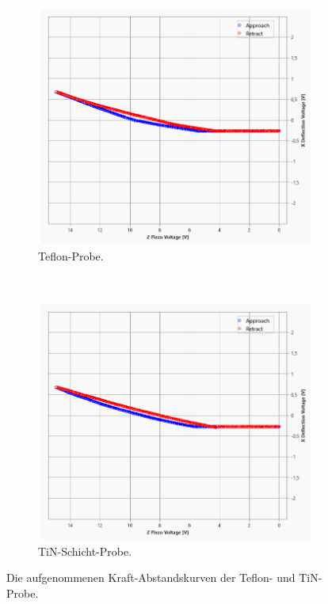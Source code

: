 \begin{figure}[H]
\centering
	\begin{subfigure}[t]{0.45\textwidth}
	\includegraphics[width=\textwidth]{AFM_auswertung/teflon_kurve.png}
	\caption{Teflon-Probe.}
	\label{abb:teflon}
	\end{subfigure}
	~
	\begin{subfigure}[t]{0.45\textwidth}
	\includegraphics[width=\textwidth]{AFM_auswertung/TiN_kurve.png}
	\caption{TiN-Schicht-Probe.}
	\end{subfigure}
\caption{Die aufgenommenen Kraft-Abstandskurven der Teflon- und TiN-Probe.}
\label{abb:teflonTiN}
\end{figure}
